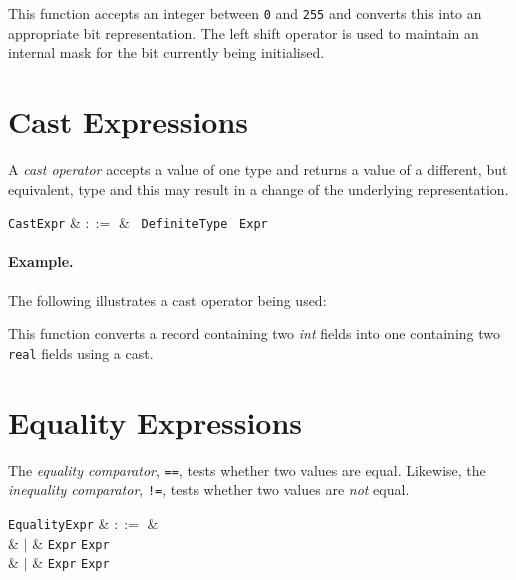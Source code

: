 

This function accepts an integer between \lstinline{0} and \lstinline{255} and converts this into an appropriate bit representation.  The left shift operator is used to maintain an internal mask for the bit currently being initialised.


\section{Cast Expressions}
\label{c_expr_cast}
A {\em cast operator} accepts a value of one type and returns a value of a different, but equivalent, type and this may result in a change of the underlying representation.  

\begin{syntax}
\verb+CastExpr+ & $::=$ & \token{(}\ \verb+DefiniteType+ \token{)}\ \verb+Expr+\\
\end{syntax}

\paragraph{Example.}  The following illustrates a cast operator being used:



This function converts a record containing two {\em int} fields into one containing two \lstinline{real} fields using a cast.


\section{Equality Expressions}
\label{c_expr_equality}
The {\em equality comparator}, \lstinline{==}, tests whether two values are equal.  Likewise, the {\em inequality comparator}, \lstinline{!=}, tests whether two values are {\em not} equal.

\begin{syntax}
  \verb+EqualityExpr+ & $::=$ &\\
  & $|$ & \verb+Expr+ \token{==} \verb+Expr+\\
  & $|$ & \verb+Expr+ \token{!=} \verb+Expr+\\
\end{syntax}

